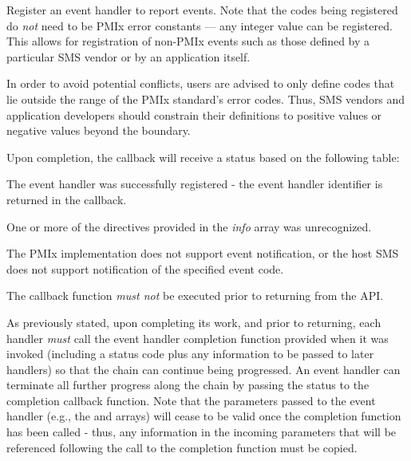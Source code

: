 Register an event handler to report events. Note that the codes being registered do \textit{not} need to be \ac{PMIx} error constants --- any integer value can be registered. This allows for registration of non-PMIx events such as those defined by a particular \ac{SMS} vendor or by an application itself.

\adviceuserstart
In order to avoid potential conflicts, users are advised to only define codes that lie outside the range of the \ac{PMIx} standard's error codes. Thus, \ac{SMS} vendors and application developers should constrain their definitions to positive values or negative values beyond the  boundary.
\adviceuserend

Upon completion, the callback will receive a status based on the following table:

\begin{constantdesc}
\item {} The event handler was successfully registered - the event handler identifier is returned in the callback.
\item {} One or more of the directives provided in the \textit{info} array was unrecognized.
\item {} The \ac{PMIx} implementation does not support event notification, or the host \ac{SMS} does not support notification of the specified event code.
\end{constantdesc}

The callback function \emph{must not} be executed prior to returning from the \ac{API}.

\adviceuserstart
As previously stated, upon completing its work, and prior to returning, each handler \textit{must} call the event handler completion function provided when it was invoked (including a status code plus any information to be passed to later handlers) so that the chain can continue being progressed. An event handler can terminate all further progress along the chain by passing the  status to the completion callback function. Note that the parameters passed to the event handler (e.g., the  and  arrays) will cease to be valid once the completion function has been called - thus, any information in the incoming parameters that will be referenced following the call to the completion function must be copied.
\adviceuserend

\subsection{}


